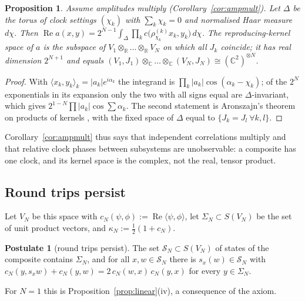 \documentclass[aps,pra,onecolumn,superscriptaddress,nofootinbib,10pt]{revtex4-2}
\newtheorem{proposition}[theorem]{Proposition}
\theoremstyle{definition}
\newtheorem{postulate}{Postulate}
\theoremstyle{remark}
\newcommand{\R}{\mathbb{R}}
\newcommand{\C}{\mathbb{C}}
\newcommand{\re}{\operatorname{Re}}
\newcommand{\ip}[2]{\langle #1,#2\rangle}
\begin{document}
\begin{proposition}\label{prop:avg}
Assume amplitudes multiply (Corollary~\ref{cor:ampmult}).  Let $\Delta$ be the torus of clock settings $(\chi_k)$ with $\sum_k\chi_k=0$ and normalised Haar
measure $d\chi$.  Then
$\re a(x,y)=2^{N-1}\int_\Delta\prod_kc\bigl(\rho^{(k)}_{\chi_k}x_k,y_k\bigr)\,d\chi$.
The reproducing-kernel space of $a$ is the subspace of $V_1\otimes_\R\dots\otimes_\R V_N$ on which all
$J_k$ coincide; it has real dimension $2^{N+1}$ and equals
$(V_1,J_1)\otimes_\C\dots\otimes_\C(V_N,J_N)\cong(\C^2)^{\otimes N}$.
\end{proposition}
\begin{proof}
With $\ip{x_k}{y_k}_k=\lvert a_k\rvert e^{i\alpha_k}$ the integrand is $\prod_k\lvert a_k\rvert\cos(\alpha_k-\chi_k)$;
of the $2^N$ exponentials in its expansion only the two with all signs equal are $\Delta$-invariant,
which gives $2^{1-N}\prod\lvert a_k\rvert\cos\sum\alpha_k$.  The second statement is Aronszajn's theorem on
products of kernels \cite{Aronszajn}, with the fixed space of $\Delta$ equal to $\{J_k=J_l\ \forall k,l\}$.
\end{proof}
Corollary~\ref{cor:ampmult} thus says that independent correlations multiply and that relative clock
phases between subsystems are unobservable: a composite has one clock, and its kernel space is the
complex, not the real, tensor product.

\subsection{Round trips persist}
Let $V_N$ be this space with $c_N(\psi,\phi):=\re\ip{\psi}{\phi}$, let $\Sigma_N\subset S(V_N)$ be the
set of unit product vectors, and $\kappa_N:=\tfrac12(1+c_N)$.

\begin{postulate}[round trips persist]\label{post:C2}
The set $\mathcal S_N\subset S(V_N)$ of states of the composite contains $\Sigma_N$, and for all
$x,w\in\mathcal S_N$ there is $s_x(w)\in\mathcal S_N$ with
$c_N(y,s_xw)+c_N(y,w)=2\,c_N(w,x)\,c_N(y,x)$ for every $y\in\Sigma_N$.
\end{postulate}
For $N=1$ this is Proposition~\ref{prop:linear}(iv), a consequence of the axiom.
\end{document}
